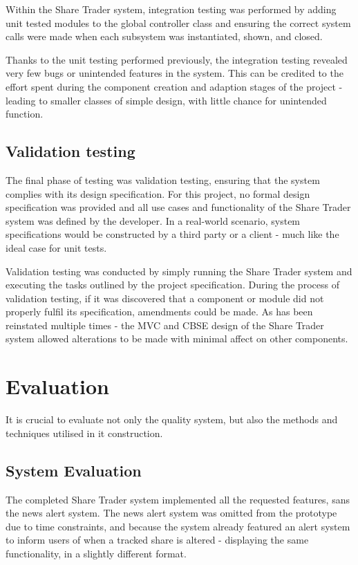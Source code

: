\documentclass[12pt, a4paper,titlepage]{article}
\begin{document}
Within the Share Trader system, integration testing was performed by adding unit
tested modules to the global controller class and ensuring the correct system
calls were made when each subsystem was instantiated, shown, and closed.

Thanks to the unit testing performed previously, the integration testing
revealed very few bugs or unintended features in the system. 
This can be credited to the effort spent during the component creation and
adaption stages of the project - leading to smaller classes of simple design,
with little chance for unintended function.

\subsection{Validation testing}
The final phase of testing was validation testing, ensuring that the system
complies with its design specification.  
For this project, no formal design specification was provided and all use
cases and functionality  of the Share Trader system was defined by the
developer.  
In a real-world scenario, system specifications would be constructed by a
third party or a client - much like the ideal case for unit tests.  

Validation testing was conducted by simply running the Share Trader system and
executing the tasks outlined by the project specification.
During the process of validation testing, if it was discovered that a
component or module did not properly fulfil its specification, amendments
could be made.
As has been reinstated multiple times - the MVC and CBSE design of the Share
Trader system allowed alterations to be made with minimal affect on other
components.


\section{Evaluation}
It is crucial to evaluate not only the quality system, but also the methods and
techniques utilised in it construction.

\subsection{System Evaluation}
The completed Share Trader system implemented all the requested features, sans
the news alert system. 
The news alert system was omitted from the prototype due to time constraints,
and because the system already featured an alert system to inform users of
when a tracked share is altered - displaying the same functionality, in a
slightly different format.
\end{document}
